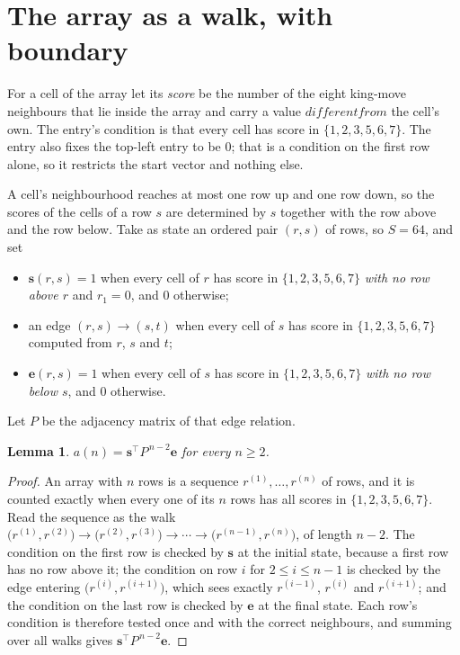 \documentclass[11pt,a4paper]{article}
\theoremstyle{plain}
\newtheorem{lemma}[theorem]{Lemma}
\theoremstyle{definition}
\begin{document}
\section{The array as a walk, with boundary}

For a cell of the array let its \emph{score} be the number of the eight king-move neighbours that lie inside
the array and carry a value $different from$ the cell's own. The entry's condition is that every cell
has score in $\{1,2,3,5,6,7\}$. The entry also fixes the top-left entry to be $0$; that is a condition on the first row alone, so it restricts the start vector and nothing else.

A cell's neighbourhood reaches at most one row up and one row down, so the scores of the
cells of a row $s$ are determined by $s$ together with the row above and the row below.
Take as state an ordered pair $(r,s)$ of rows, so $S=64$, and set
\begin{itemize}
\item $\mathbf{s}(r,s)=1$ when every cell of $r$ has score in $\{1,2,3,5,6,7\}$ \emph{with no row
above $r$} and $r_1=0$, and $0$ otherwise;
\item an edge $(r,s)\to(s,t)$ when every cell of $s$ has score in $\{1,2,3,5,6,7\}$ computed from
$r$, $s$ and $t$;
\item $\mathbf{e}(r,s)=1$ when every cell of $s$ has score in $\{1,2,3,5,6,7\}$ \emph{with no row
below $s$}, and $0$ otherwise.
\end{itemize}
Let $P$ be the adjacency matrix of that edge relation.

\begin{lemma}\label{lem:walk}
$a(n)=\mathbf{s}^{\!\top}P^{\,n-2}\mathbf{e}$ for every $n\ge2$.
\end{lemma}

\begin{proof}
An array with $n$ rows is a sequence $r^{(1)},\dots,r^{(n)}$ of rows, and it is counted
exactly when every one of its $n$ rows has all scores in $\{1,2,3,5,6,7\}$. Read the sequence as the
walk $\bigl(r^{(1)},r^{(2)}\bigr)\to\bigl(r^{(2)},r^{(3)}\bigr)\to\cdots\to
\bigl(r^{(n-1)},r^{(n)}\bigr)$, of length $n-2$. The condition on the first row is
checked by $\mathbf{s}$ at the initial state, because a first row has no row above it; the
condition on row $i$ for $2\le i\le n-1$ is checked by the edge entering
$\bigl(r^{(i)},r^{(i+1)}\bigr)$, which sees exactly $r^{(i-1)}$, $r^{(i)}$ and
$r^{(i+1)}$; and the condition on the last row is checked by $\mathbf{e}$ at the final
state. Each row's condition is therefore tested once and with the correct neighbours, and
summing over all walks gives $\mathbf{s}^{\!\top}P^{\,n-2}\mathbf{e}$.
\end{proof}
\end{document}
